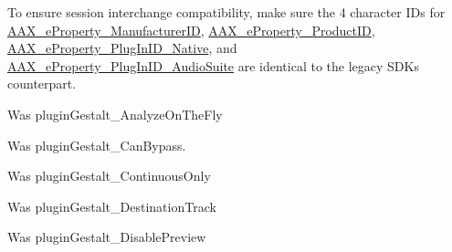 \begin{DoxyRefList}
\label{a00787__porting_notes000040}%
%
 To ensure session interchange compatibility, make sure the 4 character I\+Ds for \mbox{\hyperlink{a00662_a13e384f22825afd3db6d68395b79ce0da996465cca29a2a15291d1c788ac5728c}{A\+A\+X\+\_\+e\+Property\+\_\+\+Manufacturer\+ID}}, \mbox{\hyperlink{a00662_a13e384f22825afd3db6d68395b79ce0da3a41fcdff5af1a4fd19dcbca7b1ba6f3}{A\+A\+X\+\_\+e\+Property\+\_\+\+Product\+ID}}, \mbox{\hyperlink{a00662_a13e384f22825afd3db6d68395b79ce0da89ca3dd6e96895cda14976c1b1ceb826}{A\+A\+X\+\_\+e\+Property\+\_\+\+Plug\+In\+I\+D\+\_\+\+Native}}, and \mbox{\hyperlink{a00662_a13e384f22825afd3db6d68395b79ce0dad3344696b8298a8b254add3d039ea927}{A\+A\+X\+\_\+e\+Property\+\_\+\+Plug\+In\+I\+D\+\_\+\+Audio\+Suite}} are identical to the legacy S\+DK\textquotesingle{}s counterpart. 
\item[Member \mbox{\hyperlink{a00662_a13e384f22825afd3db6d68395b79ce0da9524773361ca8e712bef3547e8c46c9b}{A\+A\+X\+\_\+e\+Property\+\_\+\+Allow\+Preview\+Without\+Analysis}} ]\label{a00787__porting_notes000050}%
%
 Was plugin\+Gestalt\+\_\+\+Analyze\+On\+The\+Fly  
\item[Member \mbox{\hyperlink{a00662_a13e384f22825afd3db6d68395b79ce0da6819867a9e86913e59decf318416d755}{A\+A\+X\+\_\+e\+Property\+\_\+\+Can\+Bypass}} ]\label{a00787__porting_notes000046}%
%
 Was plugin\+Gestalt\+\_\+\+Can\+Bypass. 
\item[Member \mbox{\hyperlink{a00662_a13e384f22825afd3db6d68395b79ce0da95054276be8782d93437cd74669366d0}{A\+A\+X\+\_\+e\+Property\+\_\+\+Continuous\+Only}} ]\label{a00787__porting_notes000053}%
%
 Was plugin\+Gestalt\+\_\+\+Continuous\+Only  
\item[Member \mbox{\hyperlink{a00662_a13e384f22825afd3db6d68395b79ce0dadd8839e5678c8880215e318197cc8d3a}{A\+A\+X\+\_\+e\+Property\+\_\+\+Destination\+Track}} ]\label{a00787__porting_notes000051}%
%
 Was plugin\+Gestalt\+\_\+\+Destination\+Track  
\item[Member \mbox{\hyperlink{a00662_a13e384f22825afd3db6d68395b79ce0da854fdc19ab908b67aa3bc1f4262aa288}{A\+A\+X\+\_\+e\+Property\+\_\+\+Disable\+Preview}} ]\label{a00787__porting_notes000055}%
%
 Was plugin\+Gestalt\+\_\+\+Disable\+Preview  
\item[Member \mbox{\hyperlink{a00662_a13e384f22825afd3db6d68395b79ce0daaf6b47f0861af74ef5c5bb316481b97d}{A\+A\+X\+\_\+e\+Property\+\_\+\+Doesnt\+Incr\+Output\+Sample}} ]\label{a00787__porting_notes000056}%

\end{DoxyRefList}
